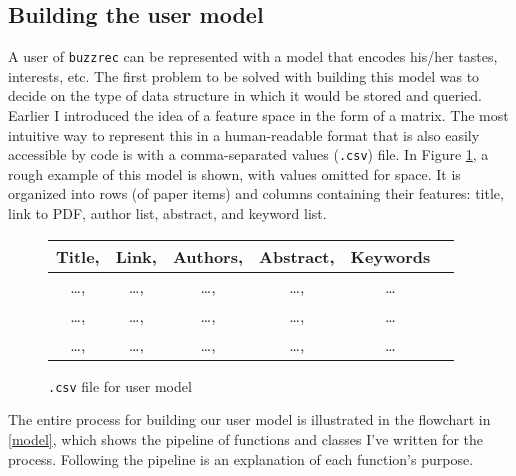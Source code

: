 \documentclass{article}
\begin{document}
\subsection{Building the user model}
A user of \texttt{buzzrec} can be represented with a model that encodes his/her tastes, interests, etc. The first problem to be solved with building this model was to decide on the type of data structure in which it would be stored and queried. Earlier I introduced the idea of a feature space in the form of a matrix. The most intuitive way to represent this in a human-readable format that is also easily accessible by code is with a comma-separated values (\texttt{.csv}) file. In Figure \ref{csv}, a rough example of this model is shown, with values omitted for space. It is organized into rows (of paper items) and columns containing their features: title, link to PDF, author list, abstract, and keyword list.

\begin{figure}[!ht]
\begin{center}
 \begin{tabular}{cccccc}
    \toprule
    Title, & Link, & Authors, & Abstract, & Keywords \\ \midrule
    \ldots, & \ldots, & \ldots, & \ldots, & \ldots  \\
    \ldots, & \ldots, & \ldots, & \ldots, & \ldots  \\
    \ldots, & \ldots, & \ldots, & \ldots, & \ldots \\ \bottomrule
  \end{tabular}
\end{center}
\caption{\texttt{.csv} file for user model}
\label{csv}
\end{figure}

The entire process for building our user model is illustrated in the flowchart in \ref{model}, which shows the pipeline of functions and classes I've written for the process. Following the pipeline is an explanation of each function's purpose. \newpage
\end{document}

